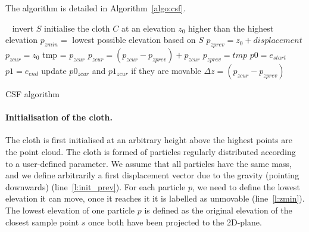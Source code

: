 The algorithm is detailed in Algorithm~\ref{algo:csf}.
\begin{algorithm} 
  \DontPrintSemicolon\
  invert $S$ \;
  initialise the cloth $C$ at an elevation $z_0$ higher than the highest elevation \;
  \For{all $p \in C$} 
  {
    $p_{zmin} =$ lowest possible elevation based on $S$  \;
    $p_{zprev} = z_0 + displacement$ \nllabel{l:init_prev}\;
    $p_{zcur} = z_0$ \;
  }
  {
    {
      {
        tmp = $p_{zcur}$ \;
        $p_{zcur} = (p_{zcur} - p_{zprev}) + p_{zcur}$ \;
        $p_{zprev} = tmp$ \;
      }
    }
    \For{all $e \in C$}
    {
      $p0 = e_{start}$ \;
      $p1 = e_{end}$ \;
      update $p0_{zcur}$ and $p1_{zcur}$ if they are movable \;
    } 
    {
      {
        $\Delta z = (p_{zcur} - p_{zprev})$ \;
      }
    }
  }
  \caption{CSF algorithm}%
\label{algo:csf}
\end{algorithm}

%

\paragraph{Initialisation of the cloth.}
The cloth is first initialised at an arbitrary height above the highest points are the point cloud.
The cloth is formed of particles regularly distributed according to a user-defined parameter.
We assume that all particles have the same mass, and we define arbitrarily a first displacement vector due to the gravity (pointing downwards) (line~\ref{l:init_prev}).
For each particle $p$, we need to define the lowest elevation it can move, once it reaches it it is labelled as unmovable (line~\ref{l:zmin}).
The lowest elevation of one particle $p$ is defined as the original elevation of the closest sample point $s$ once both have been projected to the 2D-plane.

